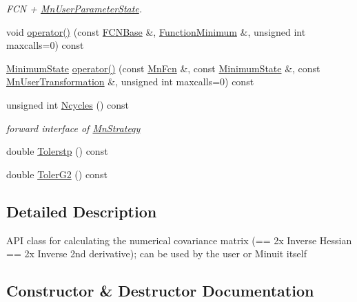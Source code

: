 \begin{DoxyCompactItemize}
\begin{DoxyCompactList}\small\item\em F\+CN + \mbox{\hyperlink{classROOT_1_1Minuit2_1_1MnUserParameterState}{Mn\+User\+Parameter\+State}}. \end{DoxyCompactList}\item 
void \mbox{\hyperlink{classROOT_1_1Minuit2_1_1MnHesse_a3b6ba68a41260029bc6bde433170e600}{operator()}} (const \mbox{\hyperlink{classROOT_1_1Minuit2_1_1FCNBase}{F\+C\+N\+Base}} \&, \mbox{\hyperlink{classROOT_1_1Minuit2_1_1FunctionMinimum}{Function\+Minimum}} \&, unsigned int maxcalls=0) const
\item 
\mbox{\hyperlink{classROOT_1_1Minuit2_1_1MinimumState}{Minimum\+State}} \mbox{\hyperlink{classROOT_1_1Minuit2_1_1MnHesse_a4130de0190695811a4606f8ab229482d}{operator()}} (const \mbox{\hyperlink{classROOT_1_1Minuit2_1_1MnFcn}{Mn\+Fcn}} \&, const \mbox{\hyperlink{classROOT_1_1Minuit2_1_1MinimumState}{Minimum\+State}} \&, const \mbox{\hyperlink{classROOT_1_1Minuit2_1_1MnUserTransformation}{Mn\+User\+Transformation}} \&, unsigned int maxcalls=0) const
\item 
unsigned int \mbox{\hyperlink{classROOT_1_1Minuit2_1_1MnHesse_a5a84b9459469f2edf55f28d8d579a00d}{Ncycles}} () const
\begin{DoxyCompactList}\small\item\em forward interface of \mbox{\hyperlink{classROOT_1_1Minuit2_1_1MnStrategy}{Mn\+Strategy}} \end{DoxyCompactList}\item 
double \mbox{\hyperlink{classROOT_1_1Minuit2_1_1MnHesse_a4b36474a0d157ecb634bbf5d120db669}{Tolerstp}} () const
\item 
double \mbox{\hyperlink{classROOT_1_1Minuit2_1_1MnHesse_ae625b94360c1c974854b63aedbcc6a1a}{Toler\+G2}} () const
\end{DoxyCompactItemize}


\subsection{Detailed Description}
A\+PI class for calculating the numerical covariance matrix (== 2x Inverse Hessian == 2x Inverse 2nd derivative); can be used by the user or Minuit itself 

\subsection{Constructor \& Destructor Documentation}
\mbox{\label{classROOT_1_1Minuit2_1_1MnHesse_a3be9ef44f3e8808dbd225df9a22aeab8}} 
